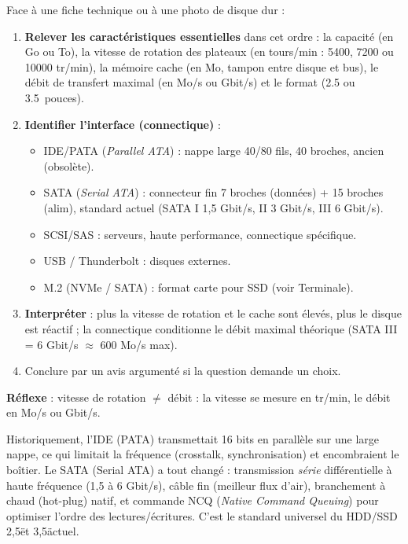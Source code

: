 \documentclass[11pt]{article}
\newcommand{\cle}[1]{{\popxbold\color{popdark}#1}}
\begin{document}
\begin{methode}
Face à une fiche technique ou à une photo de disque dur :
\begin{enumerate}
\item \textbf{Relever les caractéristiques essentielles} dans cet ordre : la \cle{capacité} (en Go ou To), la \cle{vitesse de rotation} des plateaux (en tours/min : \num{5400}, \num{7200} ou \num{10000} tr/min), la mémoire \cle{cache} (en Mo, tampon entre disque et bus), le \cle{débit} de transfert maximal (en Mo/s ou Gbit/s) et le \cle{format} (\SI{2,5}{} ou \SI{3,5}{pouces}).
\item \textbf{Identifier l'interface (connectique)} :
\begin{itemize}
\item \cle{IDE/PATA} (\emph{Parallel ATA}) : nappe large 40/80 fils, 40 broches, ancien (obsolète).
\item \cle{SATA} (\emph{Serial ATA}) : connecteur fin 7 broches (données) + 15 broches (alim), standard actuel (SATA I 1,5 Gbit/s, II 3 Gbit/s, III 6 Gbit/s).
\item \cle{SCSI/SAS} : serveurs, haute performance, connectique spécifique.
\item \cle{USB / Thunderbolt} : disques externes.
\item \cle{M.2 (NVMe / SATA)} : format carte pour SSD (voir Terminale).
\end{itemize}
\item \textbf{Interpréter} : plus la vitesse de rotation et le cache sont élevés, plus le disque est réactif ; la connectique conditionne le débit maximal théorique (SATA III = 6 Gbit/s $\approx$ 600 Mo/s max).
\item Conclure par un avis argumenté si la question demande un choix.
\end{enumerate}
\textbf{Réflexe} : vitesse de rotation $\neq$ débit : la vitesse se mesure en tr/min, le débit en Mo/s ou Gbit/s.
\end{methode}

\begin{savaistu}
Historiquement, l'IDE (PATA) transmettait 16 bits en parallèle sur une large nappe, ce qui limitait la fréquence (crosstalk, synchronisation) et encombraient le boîtier. Le SATA (Serial ATA) a tout changé : transmission \emph{série} différentielle à haute fréquence (1,5 à 6 Gbit/s), câble fin (meilleur flux d'air), branchement à chaud (hot-plug) natif, et commande NCQ (\emph{Native Command Queuing}) pour optimiser l'ordre des lectures/écritures. C'est le standard universel du HDD/SSD 2,5\" et 3,5\" actuel.
\end{savaistu}
\end{document}
